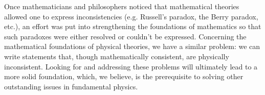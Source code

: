 \documentclass[10pt,twocolumn, nofootinbib]{revtex4-2}
\begin{document}
Once mathematicians and philosophers noticed that mathematical theories allowed one to express inconsistencies (e.g. Russell's paradox, the Berry paradox, etc.), an effort was put into strengthening the foundations of mathematics so that such paradoxes were either resolved or couldn't be expressed. Concerning the mathematical foundations of physical theories, we have a similar problem: we can write statements that, though mathematically consistent, are physically inconsistent. Looking for and addressing these problems will ultimately lead to a more solid foundation, which, we believe, is the prerequisite to solving other outstanding issues in fundamental physics.
\end{document}
